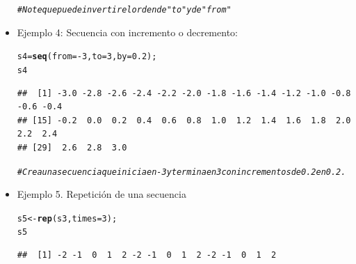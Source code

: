 \documentclass[12pt,letterpaper]{article}\usepackage[]{graphicx}\usepackage[]{color}
\makeatletter
\newcommand{\hlnum}[1]{\textcolor[rgb]{0.686,0.059,0.569}{#1}}%
\newcommand{\hlcom}[1]{\textcolor[rgb]{0.678,0.584,0.686}{\textit{#1}}}%
\newcommand{\hlopt}[1]{\textcolor[rgb]{0,0,0}{#1}}%
\newcommand{\hlstd}[1]{\textcolor[rgb]{0.345,0.345,0.345}{#1}}%
\newcommand{\hlkwb}[1]{\textcolor[rgb]{0.69,0.353,0.396}{#1}}%
\newcommand{\hlkwc}[1]{\textcolor[rgb]{0.333,0.667,0.333}{#1}}%
\newcommand{\hlkwd}[1]{\textcolor[rgb]{0.737,0.353,0.396}{\textbf{#1}}}%
\newenvironment{kframe}{%
 \def\at@end@of@kframe{}%
 \ifinner\ifhmode%
  \def\at@end@of@kframe{\end{minipage}}%
  \begin{minipage}{\columnwidth}%
 \fi\fi%
 \def\FrameCommand##1{\hskip\@totalleftmargin \hskip-\fboxsep
 \colorbox{shadecolor}{##1}\hskip-\fboxsep
     \hskip-\linewidth \hskip-\@totalleftmargin \hskip\columnwidth}%
 \MakeFramed {\advance\hsize-\width
   \@totalleftmargin\z@ \linewidth\hsize
   \@setminipage}}%
 {\par\unskip\endMakeFramed%
 \at@end@of@kframe}
\newenvironment{knitrout}{}{} %
\makeatother
\begin{document}
\begin{itemize}
\begin{knitrout}
\begin{kframe}
\begin{alltt}
\hlcom{# Note que puede invertir el orden de "to" y de "from"}
\end{alltt}
\end{kframe}
\end{knitrout}
\item Ejemplo 4: Secuencia con incremento o decremento:
\begin{knitrout}
\color{fgcolor}\begin{kframe}
\begin{alltt}
\hlstd{s4}\hlkwb{=}\hlkwd{seq}\hlstd{(}\hlkwc{from}\hlstd{=}\hlopt{-}\hlnum{3}\hlstd{,} \hlkwc{to}\hlstd{=}\hlnum{3}\hlstd{,} \hlkwc{by}\hlstd{=}\hlnum{0.2}\hlstd{);}
\hlstd{s4}
\end{alltt}
\begin{verbatim}
##  [1] -3.0 -2.8 -2.6 -2.4 -2.2 -2.0 -1.8 -1.6 -1.4 -1.2 -1.0 -0.8 -0.6 -0.4
## [15] -0.2  0.0  0.2  0.4  0.6  0.8  1.0  1.2  1.4  1.6  1.8  2.0  2.2  2.4
## [29]  2.6  2.8  3.0
\end{verbatim}
\begin{alltt}
\hlcom{# Crea una secuencia que inicia en -3 y termina en 3 con incrementos de 0.2 en 0.2.}
\end{alltt}
\end{kframe}
\end{knitrout}
\item Ejemplo 5. Repetici\'on de una secuencia
\begin{knitrout}
\color{fgcolor}\begin{kframe}
\begin{alltt}
\hlstd{s5} \hlkwb{<-} \hlkwd{rep}\hlstd{(s3,} \hlkwc{times}\hlstd{=}\hlnum{3}\hlstd{);}
\hlstd{s5}
\end{alltt}
\begin{verbatim}
##  [1] -2 -1  0  1  2 -2 -1  0  1  2 -2 -1  0  1  2
\end{verbatim}
\end{kframe}
\end{knitrout}
\end{itemize}
\end{document}
